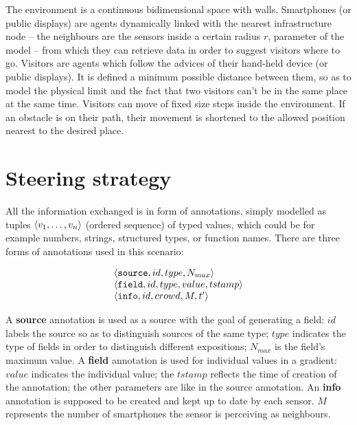 \documentclass[12pt,a4paper,twoside,openright]{book}
\begin{document}
The environment is a continuous bidimensional space with walls. 
%
Smartphones (or public displays) are agents dynamically linked with the nearest infrastructure node -- the neighbours are the sensors inside a certain radius $r$, parameter of the model -- from which they can retrieve data in order to suggest visitors where to go. Visitors are agents which follow the advices of their hand-held device (or public displays). It is defined a minimum possible distance between them, so as to model the physical limit and the fact that two visitors can't be in the same place at the same time. Visitors can move of fixed size steps inside the environment. If an obstacle is on their path, their movement is shortened to the allowed position nearest to the desired place.

\section{Steering strategy}

All the information exchanged is in form of annotations, simply modelled as tuples $\langle v_1,\ldots,v_n\rangle$ (ordered sequence) of typed values, which could be for example numbers, strings, structured types, or function names.
%
\noindent There are three forms of annotations used in this scenario:

{\[\begin{array}{l}
 \langle \mathtt{source}, id, type, N_{max}\rangle \\
 \langle \mathtt{field}, id, type, value, tstamp\rangle \\
\langle \mathtt{info}, id, crowd, M, t'\rangle \\
\end{array}\]}

\noindent A \textbf{source} annotation is used as a source with the goal of generating a field: $id$ labels the source so as to distinguish sources of the same type; $type$ indicates the type of fields in order to distinguish different expositions; $N_{max}$ is the field's maximum value. 
%
A \textbf{field} annotation is used for individual values in a gradient: $value$ indicates the individual value; the $tstamp$ reflects the time of creation of the annotation; the other parameters are like in the source annotation.
%
An \textbf{info} annotation is supposed to be created and kept up to date by each sensor. $M$ represents the number of smartphones the sensor is perceiving as neighbours.
\end{document}
